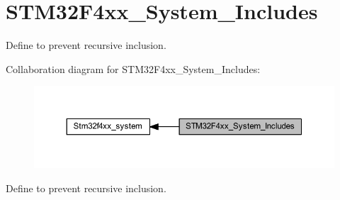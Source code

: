 \hypertarget{group___s_t_m32_f4xx___system___includes}{}\section{S\+T\+M32\+F4xx\+\_\+\+System\+\_\+\+Includes}
\label{group___s_t_m32_f4xx___system___includes}


Define to prevent recursive inclusion.  


Collaboration diagram for S\+T\+M32\+F4xx\+\_\+\+System\+\_\+\+Includes\+:
\nopagebreak
\begin{figure}[H]
\begin{center}
\leavevmode
\includegraphics[width=350pt]{group___s_t_m32_f4xx___system___includes}
\end{center}
\end{figure}
Define to prevent recursive inclusion. 

